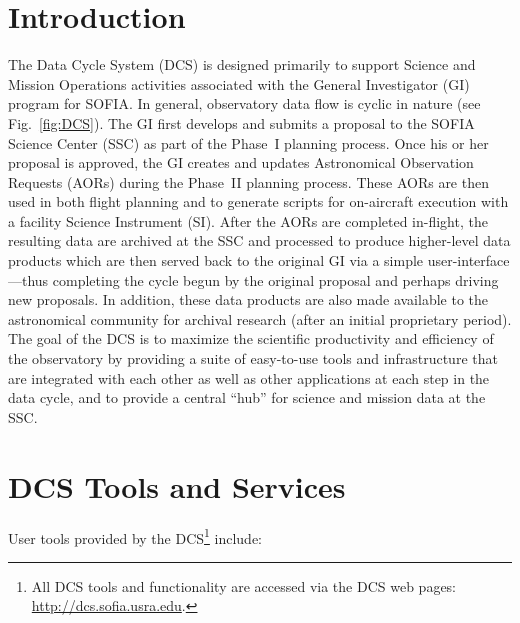 \section{Introduction}

The Data Cycle System (DCS) is designed primarily to support Science and Mission Operations activities associated with the General Investigator (GI) program for SOFIA. In general, observatory data flow is cyclic in nature (see Fig.~\ref{fig:DCS}).  The GI first develops and submits a proposal to the SOFIA Science Center (SSC) as part of the Phase~I planning process. Once his or her proposal is approved, the GI creates and updates Astronomical Observation Requests (AORs) during the Phase~II planning process. These AORs are then used in both flight planning and to generate scripts for on-aircraft execution with a facility Science Instrument (SI). After the AORs are completed in-flight, the resulting data are archived at the SSC and processed to produce higher-level data products which are then served back to the original GI via a simple user-interface---thus completing the cycle begun by the original proposal and perhaps driving new proposals. In addition, these data products are also made available to the astronomical community for archival research (after an initial proprietary period).  The goal of the DCS is to maximize the scientific productivity and efficiency of the observatory by providing a suite of easy-to-use tools and infrastructure that are integrated with each other as well as other applications at each step in the data cycle, and to provide a central ``hub'' for science and mission data at the SSC.



\section{DCS Tools and Services}


User tools provided by the DCS\footnote{All DCS tools and functionality are accessed via the DCS web pages:  \url{http://dcs.sofia.usra.edu}. } 
include:

